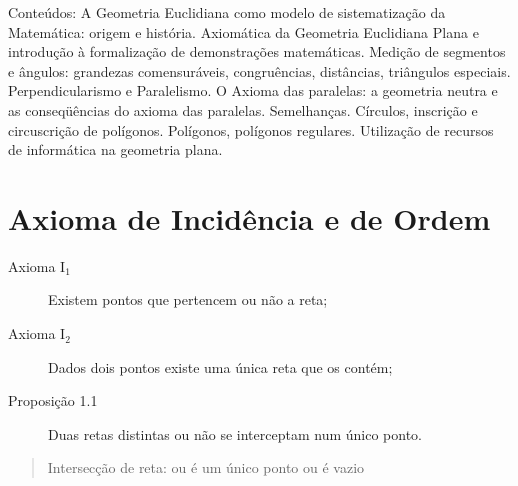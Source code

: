 Conteúdos: A Geometria Euclidiana como modelo de sistematização da Matemática: origem e história. Axiomática da Geometria Euclidiana Plana e introdução à formalização de demonstrações matemáticas. Medição de segmentos e ângulos: grandezas comensuráveis, congruências, distâncias, triângulos especiais. Perpendicularismo e Paralelismo. O Axioma das paralelas: a geometria neutra e as conseqüências do axioma das paralelas. Semelhanças. Círculos, inscrição e circuscrição de polígonos. Polígonos, polígonos regulares. Utilização de recursos de informática na geometria plana. 

\section{Axioma de Incidência e de Ordem}


\begin{description}
  \item[Axioma I$_{1}$] Existem pontos que pertencem ou não a reta;
  \item[Axioma I$_{2}$] Dados dois pontos existe uma única reta que os contém;
  \item[Proposição 1.1] Duas retas distintas ou não se interceptam num único
    ponto.
\end{description}

\begin{quote}
  Intersecção de reta: ou é um único ponto ou é vazio
\end{quote}


